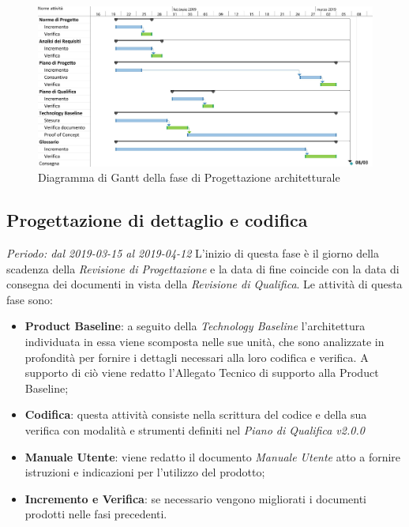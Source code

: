 \begin{figure}[H]
	\includegraphics[width=0.99\linewidth]{res/images/gantt_pa.jpg}
	\caption{Diagramma di Gantt della fase di Progettazione architetturale}
\end{figure}


\subsection{Progettazione di dettaglio e codifica}
\textit{Periodo: dal 2019-03-15 al 2019-04-12}
L'inizio di questa fase è il giorno della scadenza della \textit{Revisione di 
Progettazione} e la data di fine coincide con la data di consegna dei documenti 
in vista della \textit{Revisione di Qualifica}. Le attività di questa fase sono:
\begin{itemize}
	\item \textbf{Product Baseline}: a seguito della \textit{Technology 
	Baseline} l'architettura individuata in essa viene scomposta nelle sue unità,
	che sono analizzate in profondità per fornire i 
	dettagli necessari alla loro codifica e verifica. A supporto 
	di ciò viene redatto l'Allegato Tecnico di supporto alla Product Baseline;
	\item \textbf{Codifica}: questa attività consiste nella scrittura del 
	codice e della sua verifica con modalità e strumenti definiti nel 
	\textit{Piano di Qualifica v2.0.0}
	\item \textbf{Manuale Utente}: viene redatto il documento \textit{Manuale 
	Utente} atto a fornire istruzioni e indicazioni per l'utilizzo del prodotto;
	\item \textbf{Incremento e Verifica}: se necessario vengono migliorati i 
	documenti prodotti nelle fasi precedenti.
\end{itemize}

